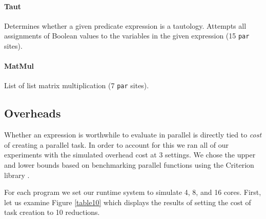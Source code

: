 \paragraph{Taut}
Determines whether a given predicate expression is a tautology. Attempts all assignments
of Boolean values to the variables in the given expression (15 \verb-par- sites).

\paragraph{MatMul}
List of list matrix multiplication (7 \verb-par- sites). 


\subsection*{Overheads} Whether an expression is worthwhile to evaluate in
parallel is directly tied to \emph{cost} of creating a parallel task. In order
to account for this we ran all of our experiments with the simulated overhead
cost at 3 settings. We chose the upper and lower bounds based on benchmarking parallel
functions using the Criterion library \citep{criterion}.


For each program we set our runtime system to simulate 4, 8, and 16 cores.
First, let us examine Figure \ref{table10} which displays the results of setting
the cost of task creation to 10 reductions.


